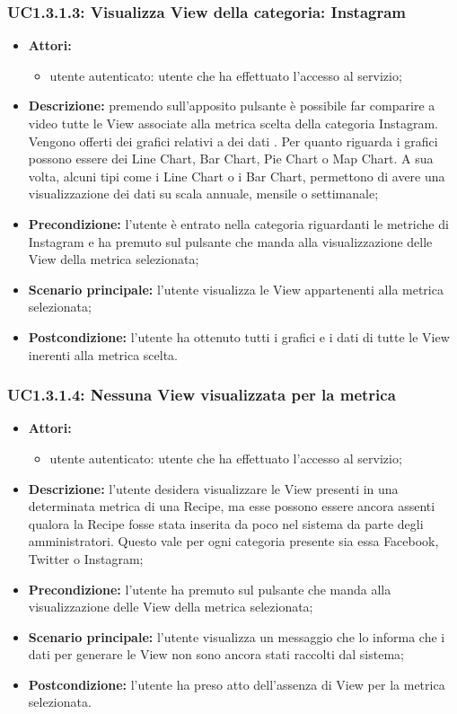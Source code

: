 \subsubsection{UC1.3.1.3: Visualizza View della categoria: Instagram}
\begin{itemize}
	\item \textbf{Attori:}
	\begin{itemize}
		\item utente autenticato: utente che ha effettuato l'accesso al servizio;
	\end{itemize}
	\item \textbf{Descrizione:} premendo sull'apposito pulsante è possibile far comparire a video tutte le View associate alla metrica scelta della categoria Instagram. Vengono offerti dei grafici relativi a dei dati
	. Per quanto riguarda i grafici possono essere dei Line Chart, Bar Chart, Pie Chart o Map Chart. A sua volta, alcuni tipi come i Line Chart o i Bar Chart, permettono di avere una visualizzazione dei dati su scala annuale, mensile o settimanale;
	\item \textbf{Precondizione:} l'utente è entrato nella categoria riguardanti le metriche di Instagram e ha premuto sul pulsante che manda alla visualizzazione delle View della metrica selezionata;
	\item \textbf{Scenario principale:} l'utente visualizza le View appartenenti alla metrica selezionata;
	\item \textbf{Postcondizione:} l'utente ha ottenuto tutti i grafici e i dati di tutte le View inerenti alla metrica scelta.
\end{itemize}

\subsubsection{UC1.3.1.4: Nessuna View visualizzata per la metrica}
\begin{itemize}
	\item \textbf{Attori:}
	\begin{itemize}
		\item utente autenticato: utente che ha effettuato l'accesso al servizio;
	\end{itemize}
	\item \textbf{Descrizione:} l'utente desidera visualizzare le View presenti in una determinata metrica di una Recipe, ma esse possono essere ancora assenti qualora la Recipe fosse stata inserita da poco nel sistema da parte degli amministratori. Questo vale per ogni categoria presente sia essa Facebook, Twitter o Instagram;
	\item \textbf{Precondizione:} l'utente ha premuto sul pulsante che manda alla visualizzazione delle View della metrica selezionata;
	\item \textbf{Scenario principale:} l'utente visualizza un messaggio che lo informa che i dati per generare le View non sono ancora stati raccolti dal sistema;
	\item \textbf{Postcondizione:} l'utente ha preso atto dell'assenza di View per la metrica selezionata.
\end{itemize}


